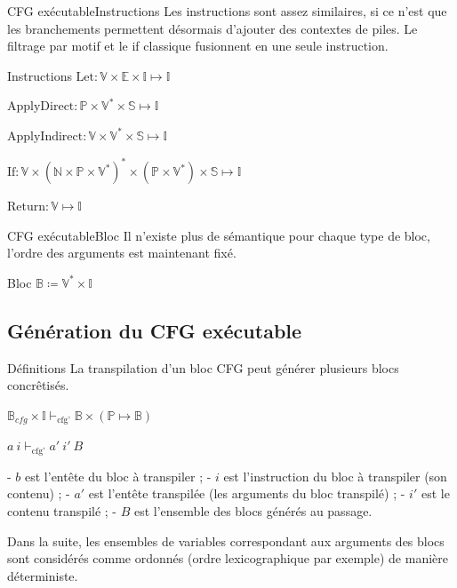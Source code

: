 \documentclass{beamer}
\begin{document}
\begin{frame}{CFG exécutable}{Instructions}
    Les instructions sont assez similaires, si ce n'est que les branchements permettent désormais d'ajouter des contextes de piles. Le filtrage par motif et le if classique fusionnent en une seule instruction.
    
    \begin{block}{Instructions}
        $\text{Let} : \mathbb{V} \times \mathbb{E} \times \mathbb{I} \mapsto \mathbb{I}$%
        
        $\text{ApplyDirect} : \mathbb{P} \times \mathbb{V}^{*} \times \mathbb{S} \mapsto \mathbb{I}$%
        
        $\text{ApplyIndirect} : \mathbb{V} \times \mathbb{V}^{*} \times \mathbb{S} \mapsto \mathbb{I}$%
        
        $\text{If} : \mathbb{V} \times (\mathbb{N} \times \mathbb{P} \times \mathbb{V}^{*})^{*} \times (\mathbb{P} \times \mathbb{V}^{*}) \times \mathbb{S} \mapsto \mathbb{I}$%
        
        $\text{Return} : \mathbb{V} \mapsto \mathbb{I}$%
    \end{block}
\end{frame}

\begin{frame}{CFG exécutable}{Bloc}
    Il n'existe plus de sémantique pour chaque type de bloc, l'ordre des arguments est maintenant fixé.
    
    \begin{block}{Bloc}
        $\mathbb{B} \coloneqq \mathbb{V}^{*} \times \mathbb{I}$%
    \end{block}
\end{frame}

\subsection{Génération du CFG exécutable}

\begin{frame}{Définitions}
    La transpilation d'un bloc CFG peut générer plusieurs blocs concrêtisés.

    $\mathbb{B}_{cfg} \times \mathbb{I} \vdash_{\text{cfg'}} \mathbb{B} \times (\mathbb{P} \mapsto \mathbb{B})$

    $a ~ i \vdash_{\text{cfg'}} a' ~ i' ~ B$

    - $b$ est l'entête du bloc à transpiler ;
    - $i$ est l'instruction du bloc à transpiler (son contenu) ;
    - $a'$ est l'entête transpilée (les arguments du bloc transpilé) ;
    - $i'$ est le contenu transpilé ;
    - $B$ est l'ensemble des blocs générés au passage.

    Dans la suite, les ensembles de variables correspondant aux arguments des blocs sont considérés comme ordonnés (ordre lexicographique par exemple) de manière déterministe.
\end{frame}
\end{document}
